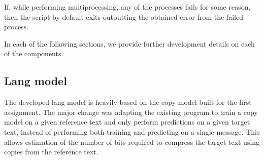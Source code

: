 \documentclass{article}
\begin{document}
If, while performing multiprocessing, any of the processes fails for some reason, then the script by default exits outputting the obtained error from the failed process.

In each of the following sections, we provide further development details on each of the components.

\subsection{Lang model}
\label{subsec:methodology_lang_model}

The developed lang model is heavily based on the copy model built for the first assignment.
The major change was adapting the existing program to train a copy model on a given reference text and only perform predictions on a given target text, instead of performing both training and predicting on a single message.
This allows estimation of the number of bits required to compress the target text using copies from the reference text.
\end{document}
